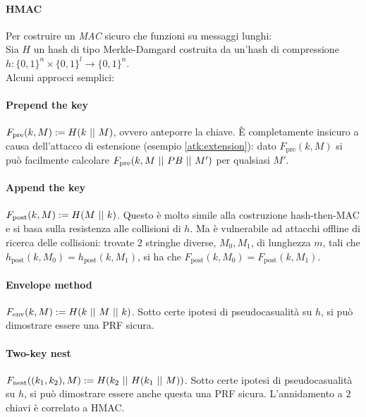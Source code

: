 \paragraph{HMAC}Per costruire un \emph{MAC} sicuro che funzioni su messaggi lunghi: \\
Sia $H$ un hash di tipo Merkle-Damgard costruita da un'hash di compressione $h: \{0,1\}^n \times \{0,1\}^l \to \{0,1\}^n$.  \\ Alcuni approcci semplici: 

\paragraph{Prepend the key} $F_{\text{pre}}(k,M):= H(k \operatorname{\,||\,} M)$, ovvero anteporre la chiave. È completamente insicuro a causa dell'attacco di estensione (esempio \ref{atk:extension}): dato $F_{\text{pre}}(k,M)$ si può facilmente calcolare $F_{\text{pre}}(k,M \operatorname{\,||\,} PB \operatorname{\,||\,} M')$ per qualsiasi $M'$. 

\paragraph{Append the key} $F_{\text{post}}(k,M):= H(M \operatorname{\,||\,} k)$. Questo è molto simile alla costruzione hash-then-MAC e si basa sulla resistenza alle collisioni di $h$. Ma è vulnerabile ad attacchi offline di ricerca delle collisioni: trovate $2$ stringhe diverse, $M_0, M_1$, di lunghezza $m$, tali che $h_{\text{post}}(k,M_0)=h_{\text{post}}(k,M_1)$, si ha che $F_{\text{post}}(k,M_0)=F_{\text{post}}(k,M_1)$.

\paragraph{Envelope method} $F_{\text{env}}(k,M):= H(k \operatorname{\,||\,} M \operatorname{\,||\,} k)$. Sotto certe ipotesi di pseudocasualità su $h$, si può dimostrare essere una PRF sicura.   


\paragraph{Two-key nest}$F_{\text{nest}}((k_1,k_2),M):= H(k_2 \operatorname{\,||\,} H(k_1 \operatorname{\,||\,} M))$. Sotto certe ipotesi di pseudocasualità su $h$, si può dimostrare essere anche questa una PRF sicura. L'annidamento a $2$ chiavi è correlato a HMAC. 

